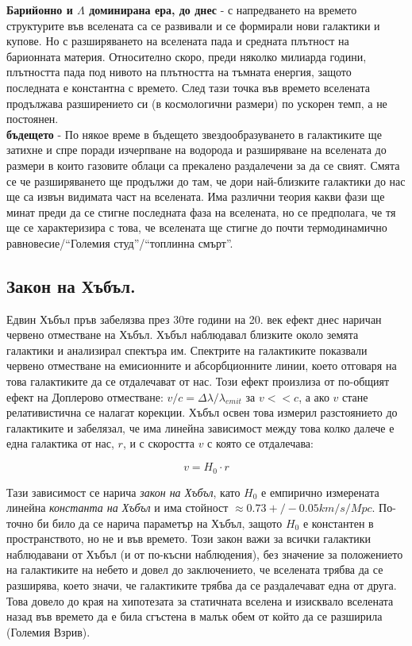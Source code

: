 \documentclass[a4paper,12pt]{article}
\begin{document}
\textbf{Барийонно и $\Lambda$ доминирана ера, до днес} - с напредването на времето структурите във вселената са се развивали и се формирали нови галактики и купове. Но с разширяването на вселената пада и средната плътност на барионната материя. Относително скоро, преди няколко милиарда години, плътността пада под нивото на плътността на тъмната енергия, защото последната е константна с времето. След тази точка във времето вселената продължава разширението си (в космологични размери) по ускорен темп, а не постоянен.\\

\textbf{бъдещето} - По някое време в бъдещето звездообразуването в галактиките ще затихне и спре поради изчерпване на водорода и разширяване на вселената до размери в които газовите облаци са прекалено раздалечени за да се свият. Смята се че разширяването ще продължи до там, че дори най-близките галактики до нас ще са извън видимата част на вселената. Има различни теория какви фази ще минат преди да се стигне последната фаза на вселената, но се предполага, че тя ще се характеризира с това, че вселената ще стигне до почти термодинамично равновесие/``Големия студ''/``топлинна смърт''.



\subsection{Закон на Хъбъл.}
Едвин Хъбъл пръв забелязва през 30те години на 20. век ефект днес наричан червено отместване на Хъбъл. Хъбъл наблюдавал близките около земята галактики и анализирал спектъра им. Спектрите на галактиките показвали червено отместване на емисионните и абсорбционните линии, което отговаря на това галактиките да се отдалечават от нас. Този ефект произлиза от по-общият ефект на Доплерово отместване: $v/c = \Delta \lambda / \lambda_{emit}$ за $v<<c$, а ако $v$ стане релативистична се налагат корекции. Хъбъл освен това измерил разстоянието до галактиките и забелязал, че има линейна зависимост между това колко далече е една галактика от нас, $r$, и с скоростта $v$ с която се отдалечава:

\begin{equation}
    v = H_0 \cdot r
\end{equation}

Тази зависимост се нарича \textit{закон на Хъбъл}, като $H_0$ е емпирично измерената линейна \textit{константа на Хъбъл} и има стойност $\approx 0.73+/-0.05 km/s/Mpc$. По-точно би било да се нарича параметър на Хъбъл, защото $H_0$ е константен в пространството, но не и във времето. Този закон важи за всички галактики наблюдавани от Хъбъл (и от по-късни наблюдения), без значение за положението на галактиките на небето и довел до заключението, че вселената трябва да се разширява, което значи, че галактиките трябва да се раздалечават една от друга. Това довело до края на хипотезата за статичната вселена и изисквало вселената назад във времето да е била сгъстена в малък обем от който да се разширила (Големия Взрив).
\end{document}
